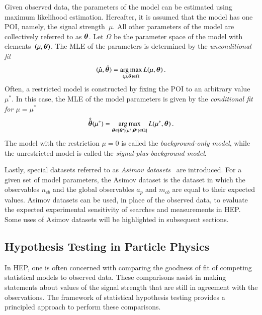 Given observed data, the parameters of the model can be estimated using maximum
likelihood estimation. Hereafter, it is assumed that the model has one POI,
namely, the signal strength~$\mu$. All other parameters of the model are
collectively referred to as $\bm{\theta}$. Let $\Omega$ be the parameter
space of the model with elements~$(\mu, \bm{\theta})$. The MLE of the
parameters is determined by the \emph{unconditional fit}
\begin{align}
  (\hat{\mu}, \hat{\bm{\theta}}) = \operatorname*{arg\,max}_{(\mu, \bm{\theta}) \in \Omega} L(\mu, \bm{\theta}) \,\text{.}
  \label{eq:unconditional_fit}
\end{align}
Often, a restricted model is constructed by fixing the POI to an arbitrary value
$\mu^*$. In this case, the MLE of the model parameters is given by the
\emph{conditional fit for $\mu = \mu^*$}
\begin{align}
  \hat{\hat{\bm{\theta}}}(\mu^*) = \operatorname*{arg\,max}_{\bm{\theta} \in \{ \bm{\theta}^\prime \mid (\mu^*, \bm{\theta}^\prime) \in \Omega \} } L(\mu^*, \bm{\theta}) \,\text{.}
  \label{eq:conditional_fit}
\end{align}
The model with the restriction $\mu = 0$ is called the \emph{background-only
  model}, while the unrestricted model is called the
\emph{signal-plus-background model}.

Lastly, special datasets referred to as \emph{Asimov
  datasets}~\cite{Cowan:2010js} are introduced. For a given set of model
parameters, the Asimov dataset is the dataset in which the observables $n_{cb}$
and the global observables $a_p$ and $m_{cb}$ are equal to their expected
values. Asimov datasets can be used, in place of the observed data, to evaluate
the expected experimental sensitivity of searches and measurements in HEP. Some
uses of Asimov datasets will be highlighted in subsequent sections.


\subsection{Hypothesis Testing in Particle Physics}%
\label{sec:hypotesting}

In HEP, one is often concerned with comparing the goodness of fit of competing
statistical models to observed data. These comparisons assist in making
statements about values of the signal strength that are still in agreement with
the observations. The framework of statistical hypothesis testing provides a
principled approach to perform these comparisons.

